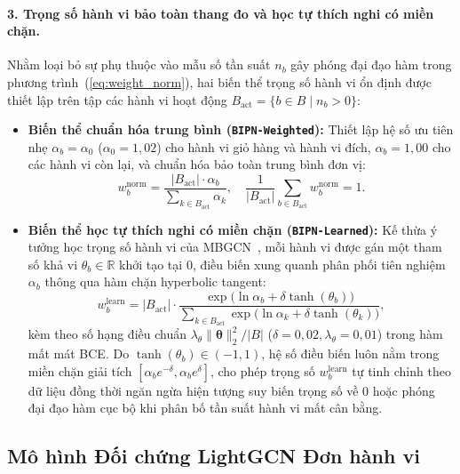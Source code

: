 \documentclass{llncs}
\begin{document}
\paragraph{3. Trọng số hành vi bảo toàn thang đo và học tự thích nghi có miền chặn.}
Nhằm loại bỏ sự phụ thuộc vào mẫu số tần suất $n_b$ gây phóng đại đạo hàm trong phương trình~(\ref{eq:weight_norm}), hai biến thể trọng số hành vi ổn định được thiết lập trên tập các hành vi hoạt động $B_{\mathrm{act}} = \{b \in B \mid n_b > 0\}$:
\begin{itemize}
\item \textbf{Biến thể chuẩn hóa trung bình (\texttt{BIPN-Weighted}):} Thiết lập hệ số ưu tiên nhẹ $\alpha_b = \alpha_0$ ($\alpha_0 = 1{,}02$) cho hành vi giỏ hàng và hành vi đích, $\alpha_b = 1{,}00$ cho các hành vi còn lại, và chuẩn hóa bảo toàn trung bình đơn vị:
\begin{equation}
w_b^{\mathrm{norm}} = \frac{|B_{\mathrm{act}}| \cdot \alpha_b}{\sum_{k \in B_{\mathrm{act}}} \alpha_k}, \quad \frac{1}{|B_{\mathrm{act}}|} \sum_{b \in B_{\mathrm{act}}} w_b^{\mathrm{norm}} = 1.
\label{eq:w_norm2}
\end{equation}
\item \textbf{Biến thể học tự thích nghi có miền chặn (\texttt{BIPN-Learned}):} Kế thừa ý tưởng học trọng số hành vi của MBGCN~\cite{jin2020mbgcn}, mỗi hành vi được gán một tham số khả vi $\theta_b \in \mathbb{R}$ khởi tạo tại $0$, điều biến xung quanh phân phối tiên nghiệm $\alpha_b$ thông qua hàm chặn hyperbolic tangent:
\begin{equation}
w_b^{\mathrm{learn}} = |B_{\mathrm{act}}| \cdot \frac{\exp\big(\ln \alpha_b + \delta \tanh(\theta_b)\big)}{\sum_{k \in B_{\mathrm{act}}} \exp\big(\ln \alpha_k + \delta \tanh(\theta_k)\big)},
\label{eq:w_learned}
\end{equation}
kèm theo số hạng điều chuẩn $\lambda_\theta \lVert \boldsymbol{\theta} \rVert_2^2 / |B|$ ($\delta = 0{,}02, \lambda_\theta = 0{,}01$) trong hàm mất mát BCE. Do $\tanh(\theta_b) \in (-1, 1)$, hệ số điều biến luôn nằm trong miền chặn giải tích $[\alpha_b e^{-\delta}, \alpha_b e^{\delta}]$, cho phép trọng số $w_b^{\mathrm{learn}}$ tự tinh chỉnh theo dữ liệu đồng thời ngăn ngừa hiện tượng suy biến trọng số về $0$ hoặc phóng đại đạo hàm cục bộ khi phân bố tần suất hành vi mất cân bằng.
\end{itemize}

\subsection{Mô hình Đối chứng LightGCN Đơn hành vi}
\label{sec:lightgcn}
\end{document}
